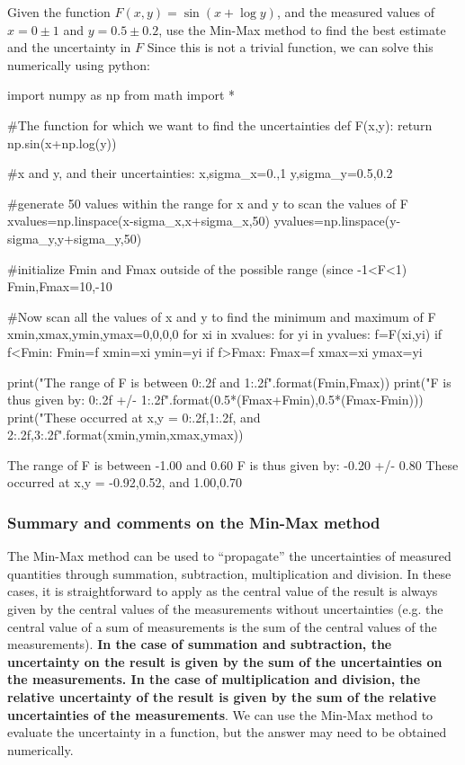 \begin{example}{Given the function $F(x,y)=\sin(x+\log y)$, and the measured values of $x=0\pm1$ and $y=0.5\pm0.2$, use the Min-Max method to find the best estimate and the uncertainty in $F$}
Since this is not a trivial function, we can solve this numerically using python:

\begin{python}[caption = Min-Max method] 
import numpy as np
from math import *

#The function for which we want to find the uncertainties
def F(x,y):
    return np.sin(x+np.log(y))

#x and y, and their uncertainties:
x,sigma_x=0.,1
y,sigma_y=0.5,0.2

#generate 50 values within the range for x and y to scan the values of F
xvalues=np.linspace(x-sigma_x,x+sigma_x,50)
yvalues=np.linspace(y-sigma_y,y+sigma_y,50)

#initialize Fmin and Fmax outside of the possible range (since -1<F<1)
Fmin,Fmax=10,-10

#Now scan all the values of x and y to find the minimum and maximum of F
xmin,xmax,ymin,ymax=0,0,0,0
for xi in xvalues:
    for yi in yvalues:
        f=F(xi,yi)
        if f<Fmin:
            Fmin=f
            xmin=xi
            ymin=yi
        if f>Fmax:
            Fmax=f
            xmax=xi
            ymax=yi
            
print("The range of F is between {0:.2f} and {1:.2f}".format(Fmin,Fmax))
print("F is thus given by: {0:.2f} +/- {1:.2f}".format(0.5*(Fmax+Fmin),0.5*(Fmax-Fmin)))
print("These occurred at x,y = {0:.2f},{1:.2f}, and {2:.2f},{3:.2f}".format(xmin,ymin,xmax,ymax))
\end{python}
\begin{poutput}
The range of F is between -1.00 and 0.60
F is thus given by: -0.20 +/- 0.80
These occurred at x,y = -0.92,0.52, and 1.00,0.70
\end{poutput}
\end{example}

\subsubsection{Summary and comments on the Min-Max method}
The Min-Max method can be used to ``propagate'' the uncertainties of measured quantities through summation, subtraction, multiplication and division. In these cases, it is straightforward to apply as the central value of the result is always given by the central values of the measurements without uncertainties (e.g. the central value of a sum of measurements is the sum of the central values of the measurements). \textbf{In the case of summation and subtraction, the uncertainty on the result is given by the sum of the uncertainties on the measurements. In the case of multiplication and division, the relative uncertainty of the result is given by the sum of the relative uncertainties of the measurements}. We can use the Min-Max method to evaluate the uncertainty in a function, but the answer may need to be obtained numerically.

